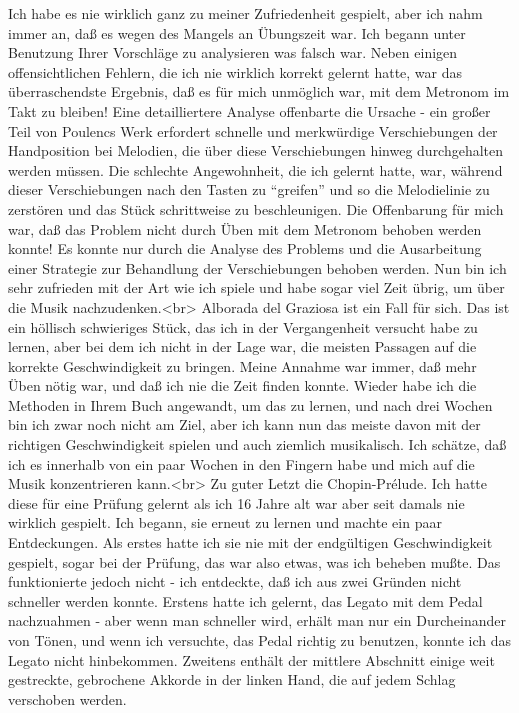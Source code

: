 Ich habe es nie wirklich ganz zu meiner Zufriedenheit gespielt, aber ich nahm immer an, daß es wegen des Mangels an Übungszeit war.
Ich begann unter Benutzung Ihrer Vorschläge zu analysieren was falsch war.
Neben einigen offensichtlichen Fehlern, die ich nie wirklich korrekt gelernt hatte, war das überraschendste Ergebnis, daß es für mich unmöglich war, mit dem Metronom im Takt zu bleiben!
Eine detailliertere Analyse offenbarte die Ursache - ein großer Teil von Poulencs Werk erfordert schnelle und merkwürdige Verschiebungen der Handposition bei Melodien, die über diese Verschiebungen hinweg durchgehalten werden müssen.
Die schlechte Angewohnheit, die ich gelernt hatte, war, während dieser Verschiebungen nach den Tasten zu \enquote{greifen} und so die Melodielinie zu zerstören und das Stück schrittweise zu beschleunigen.
Die Offenbarung für mich war, daß das Problem nicht durch Üben mit dem Metronom behoben werden konnte!
Es konnte nur durch die Analyse des Problems und die Ausarbeitung einer Strategie zur Behandlung der Verschiebungen behoben werden.
Nun bin ich sehr zufrieden mit der Art wie ich spiele und habe sogar viel Zeit übrig, um über die Musik nachzudenken.<br>
Alborada del Graziosa ist ein Fall für sich.
Das ist ein höllisch schwieriges Stück, das ich in der Vergangenheit versucht habe zu lernen, aber bei dem ich nicht in der Lage war, die meisten Passagen auf die korrekte Geschwindigkeit zu bringen.
Meine Annahme war immer, daß mehr Üben nötig war, und daß ich nie die Zeit finden konnte.
Wieder habe ich die Methoden in Ihrem Buch angewandt, um das zu lernen, und nach drei Wochen bin ich zwar noch nicht am Ziel, aber ich kann nun das meiste davon mit der richtigen Geschwindigkeit spielen und auch ziemlich musikalisch.
Ich schätze, daß ich es innerhalb von ein paar Wochen in den Fingern habe und mich auf die Musik konzentrieren kann.<br>
Zu guter Letzt die Chopin-Prélude.
Ich hatte diese für eine Prüfung gelernt als ich 16 Jahre alt war aber seit damals nie wirklich gespielt.
Ich begann, sie erneut zu lernen und machte ein paar Entdeckungen.
Als erstes hatte ich sie nie mit der endgültigen Geschwindigkeit gespielt, sogar bei der Prüfung, das war also etwas, was ich beheben mußte.
Das funktionierte jedoch nicht - ich entdeckte, daß ich aus zwei Gründen nicht schneller werden konnte.
Erstens hatte ich gelernt, das Legato mit dem Pedal nachzuahmen - aber wenn man schneller wird, erhält man nur ein Durcheinander von Tönen, und wenn ich versuchte, das Pedal richtig zu benutzen, konnte ich das Legato nicht hinbekommen.
Zweitens enthält der mittlere Abschnitt einige weit gestreckte, gebrochene Akkorde in der linken Hand, die auf jedem Schlag verschoben werden.
